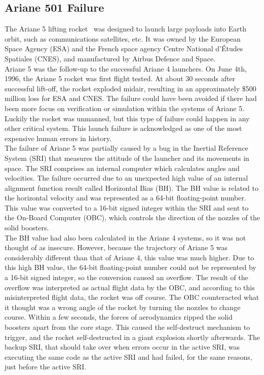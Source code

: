 \subsection{Ariane 501 Failure}
The Ariane 5 lifting rocket~\cite{InquiryBoard1996} was designed to launch large payloads into Earth orbit, such as communications satellites, etc. It was owned by the European Space Agency (ESA) and the French space agency Centre National d'\'Etudes Spatiales (CNES), and manufactured by Airbus Defence and Space.\\

Ariane 5 was the follow-up to the successful Ariane 4 launchers. On June 4th, 1996, the Ariane 5 rocket was first flight tested. At about 30 seconds after successful lift-off, the rocket exploded midair, resulting in an approximately \$500 million loss for ESA and CNES. The failure could have been avoided if there had been more focus on verification or simulation within the systems of Ariane 5. Luckily the rocket was unmanned, but this type of failure could happen in any other critical system. This launch failure is acknowledged as one of the most expensive human errors in history. \\

The failure of Ariane 5 was partially caused by a bug in the Inertial Reference System (SRI) that measures the attitude of the launcher and its movements in space. The SRI comprises an internal computer which calculates angles and velocities.
The failure occurred due to an unexpected high value of an internal alignment function result called Horizontal Bias (BH). The BH value is related to the horizontal velocity and was represented as a 64-bit floating-point number. This value was converted to a 16-bit signed integer within the SRI and sent to the On-Board Computer (OBC), which controls the direction of the nozzles of the solid boosters.\\

The BH value had also been calculated in the Ariane 4 systems, so it was not thought of as insecure. However, because the trajectory of Ariane 5 was considerably different than that of Ariane 4, this value was much higher. Due to this high BH value, the 64-bit floating-point number could not be represented by a 16-bit signed integer, so the conversion caused an overflow.
The result of the overflow was interpreted as actual flight data by the OBC, and according to this misinterpreted flight data, the rocket was off course. The OBC counteracted what it thought was a wrong angle of the rocket by turning the nozzles to change course. Within a few seconds, the forces of aerodynamics ripped the solid boosters apart from the core stage. This caused the self-destruct mechanism to trigger, and the rocket self-destructed in a giant explosion shortly afterwards. The backup SRI, that should take over when errors occur in the active SRI, was executing the same code as the active SRI and had failed, for the same reasons, just before the active SRI.\\

